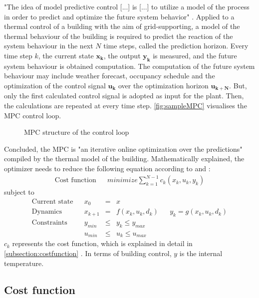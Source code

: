 "The idea of model predictive control [...] is [...] to utilize a model of the process in order to predict and optimize the future system behavior"
\cite{Grune.2017}.
Applied to a thermal control of a building with the aim of grid-supporting, a model of the thermal behaviour of the building is required to predict the reaction of the system behaviour in the next $N$ time steps, called the prediction horizon. Every time step $k$, the current state $\mathbf{x_k}$, the output $\mathbf{y_k}$ is measured, and the future system behaviour is obtained computation. The computation of the future system behaviour may include weather forecast, occupancy schedule and the optimization of the control signal $\mathbf{u_k}$ over the optimization horizon $\mathbf{u_{k+N}}$. But, only the first calculated control signal is adopted as input for the plant.
Then, the calculations are repeated at every time step. \autoref{fig:sampleMPC} visualises the MPC control loop.
 \begin{figure}[h]
    \centering
   \def\svgwidth{320pt}
    
    \caption{MPC structure of the control loop}
    \label{fig:sampleMPC}
    \end{figure}
\newline
Concluded, the MPC is "an iterative online optimization over the predictions"
\cite{Grune.2017} 
compiled by the thermal model of the building. Mathematically explained, the optimizer needs to reduce the following equation according to
\cite{Kouvaritakis.2018}
and
\cite{Oldewurtel.2012}:
\begin{align}
\label{eq:costfunc}
\textrm{Cost function} && minimize \sum_{k=1}^{N-1} c_k(x_k,u_k,y_k)
\end{align}
subject to 
\begin{align*}
\textrm{Current state} && x_0 &=& x \\	
\textrm{Dynamics} && x_{k+1}&=& f(x_k,u_k,d_k)		&&	y_k = g(x_k,u_k,d_k)\\				
\textrm{Constraints} && y_{min}&\leq& y_k \leq y_{max}\\		
\textrm{} && u_{min}&\leq& u_k \leq u_{max}	
\end{align*}
$c_k$ represents the cost function, which is explained in detail in \autoref{subsection:costfunction}
. In terms of building control, $y$ is the internal temperature.

\subsection{Cost function}
\label{subsection:costfunction}


